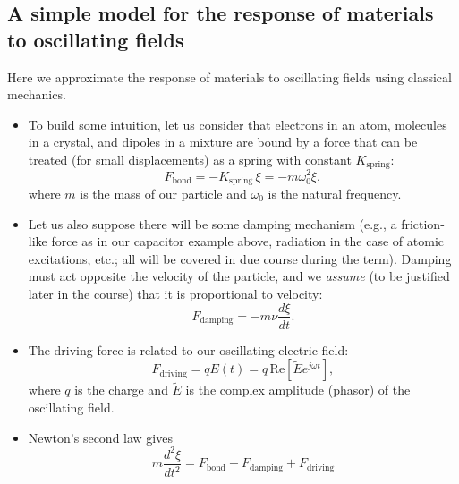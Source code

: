 \documentclass[11pt, oneside]{article}
\begin{document}
\subsection{A simple model for the response of materials to oscillating fields}

Here we approximate the response of materials to oscillating fields using classical mechanics.
\begin{itemize}
	\item To build some intuition, let us consider that electrons in an atom, molecules in a crystal, and dipoles in a mixture are bound by a force that can be treated (for small displacements) as a spring with constant $K_\mathrm{spring}$:
	\begin{equation}
		F_\mathrm{bond} = -K_\mathrm{spring}\,\xi = -m\omega_0^2 \xi,
	\end{equation}
	where $m$ is the mass of our particle and $\omega_0$ is the natural frequency.
	\item Let us also suppose there will be some damping mechanism (e.g., a friction-like force as in our capacitor example above, radiation in the case of atomic excitations, etc.; all will be covered in due course during the term). Damping must act opposite the velocity of the particle, and we \emph{assume} (to be justified later in the course) that it is proportional to velocity:
	\begin{equation}
		F_\mathrm{damping} = -m\nu\frac{d\xi}{dt}.
	\end{equation}
	\item The driving force is related to our oscillating electric field:
	\begin{equation}
		F_\mathrm{driving} = qE(t) = q\,\mathrm{Re}\left[\tilde{E}e^{j\omega t}\right],
	\end{equation}
	where $q$ is the charge and $\tilde{E}$ is the complex amplitude (phasor) of the oscillating field.
	\item Newton's second law gives
	\begin{equation}
		m\frac{d^2\xi}{dt^2} = F_\mathrm{bond} + F_\mathrm{damping} + F_\mathrm{driving}

\end{equation}
\end{itemize}
\end{document}
